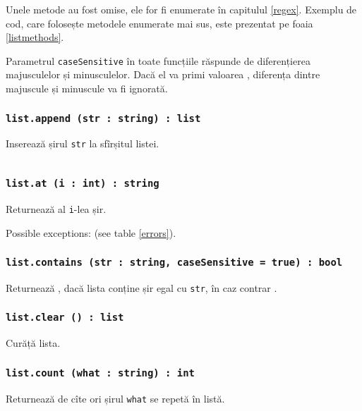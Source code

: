 Unele metode au fost omise, ele for fi enumerate în capitulul \ref{regex}. Exemplu de cod, care folosește metodele enumerate mai sus, este prezentat pe foaia \ref{listmethods}. 

Parametrul \texttt{caseSensitive} în toate funcțiile răspunde de diferențierea majusculelor și minusculelor. Dacă el va primi valoarea \false, diferența dintre majuscule și minuscule va fi ignorată.

\subsubsection{\texttt{list.append (str : string) : list}}

Inserează șirul \texttt{str} la sfîrșitul listei.

\newpage
\begin{sourcecode}
    \label{listmethods}
    \inputminted[linenos]{icl}{../sources/listmethods.icL}
\end{sourcecode}

\subsubsection{\texttt{list.at (i : int) : string}}

Returnează al \texttt{i}-lea șir.

Possible exceptions:  (see table \ref{errors}).

\subsubsection{\texttt{list.contains (str : string, caseSensitive = true) : bool}}

Returnează \true, dacă lista conține șir egal cu \texttt{str}, în caz contrar \false.

\subsubsection{\texttt{list.clear () : list}}

Curăță lista.

\subsubsection{\texttt{list.count (what : string) : int}}

Returnează de cîte ori șirul \texttt{what} se repetă în listă.

